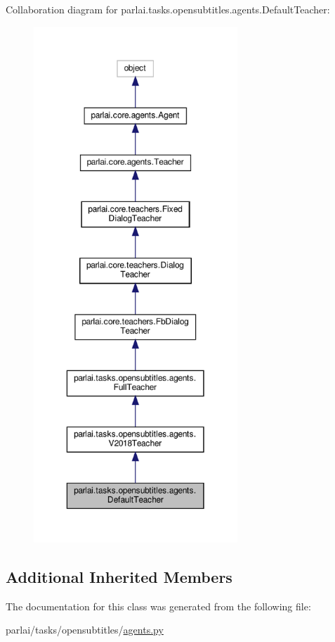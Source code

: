 Collaboration diagram for parlai.\+tasks.\+opensubtitles.\+agents.\+Default\+Teacher\+:
\nopagebreak
\begin{figure}[H]
\begin{center}
\leavevmode
\includegraphics[height=550pt]{classparlai_1_1tasks_1_1opensubtitles_1_1agents_1_1DefaultTeacher__coll__graph}
\end{center}
\end{figure}
\subsection*{Additional Inherited Members}


The documentation for this class was generated from the following file\+:\begin{DoxyCompactItemize}
\item 
parlai/tasks/opensubtitles/\hyperlink{parlai_2tasks_2opensubtitles_2agents_8py}{agents.\+py}\end{DoxyCompactItemize}
